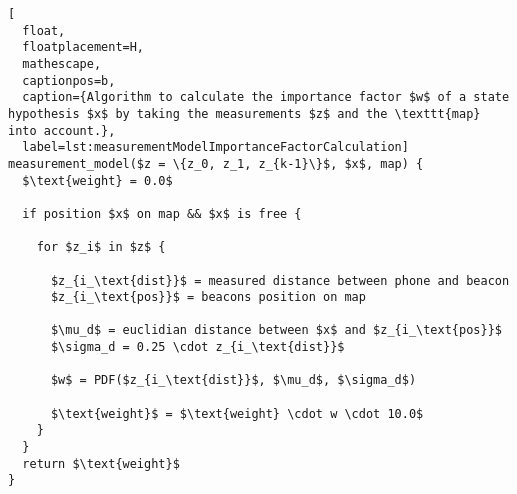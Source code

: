 \begin{lstlisting}[
  float,
  floatplacement=H,
  mathescape,
  captionpos=b,
  caption={Algorithm to calculate the importance factor $w$ of a state hypothesis $x$ by taking the measurements $z$ and the \texttt{map} into account.},
  label=lst:measurementModelImportanceFactorCalculation]
measurement_model($z = \{z_0, z_1, z_{k-1}\}$, $x$, map) {
  $\text{weight} = 0.0$

  if position $x$ on map && $x$ is free {

    for $z_i$ in $z$ {

      $z_{i_\text{dist}}$ = measured distance between phone and beacon
      $z_{i_\text{pos}}$ = beacons position on map

      $\mu_d$ = euclidian distance between $x$ and $z_{i_\text{pos}}$
      $\sigma_d = 0.25 \cdot z_{i_\text{dist}}$

      $w$ = PDF($z_{i_\text{dist}}$, $\mu_d$, $\sigma_d$)

      $\text{weight}$ = $\text{weight} \cdot w \cdot 10.0$
    }
  }
  return $\text{weight}$
}
\end{lstlisting}
